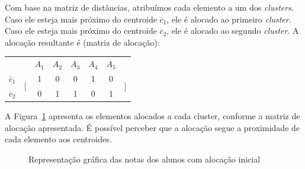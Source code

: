 \insertspace

Com base na matriz de distâncias, atribuímos cada elemento a um dos \textit{clusters}. Caso ele esteja mais próximo do centroide $\overline{c}_1$, ele é alocado ao primeiro \textit{cluster}. Caso ele esteja mais próximo do centroide $\overline{c}_2$, ele é alocado ao segundo \textit{cluster}. A alocação resultante é (matriz de alocação):

\insertspace

\begin{center}
	\begin{tabular}{cccccccc}
		& & $A_1$ & $A_2$ & $A_3$ & $A_4$ & $A_5$ & \\
		$\overline{c}_1$ & \multirow{2}{*}{$\Bigg[$} & 1  & 0  & 0  & 1  & 0  & \multirow{2}{*}{$\Bigg]$} \\
		\multicolumn{1}{l}{$\overline{c}_2$} & & 0  & 1  & 1  & 0  & 1  &                  
	\end{tabular}
\end{center}

\insertspace

A Figura~\ref{fig:dados-notas-alunos-primeira-alocacao} apresenta os elementos alocados a cada cluster, conforme a matriz de alocação apresentada. É possível perceber que a alocação segue a proximidade de cada elemento aos centroides.

\begin{figure}[h]
	\centering
	
	
	
	\caption{Representação gráfica das notas dos alunos com alocação inicial}
	\label{fig:dados-notas-alunos-primeira-alocacao}
\end{figure}

